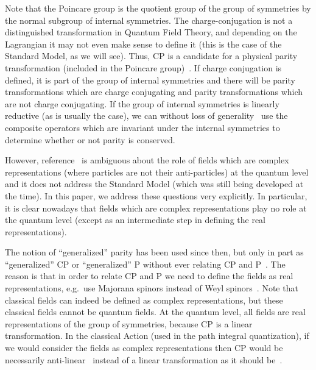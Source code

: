 \documentclass[11pt]{book}
\begin{document}
Note that the Poincare group is the quotient group of the group of
symmetries by the normal subgroup of internal symmetries. The
charge-conjugation is not a distinguished transformation in Quantum
Field Theory, and depending on the Lagrangian it may not even make sense
to define it (this is the case of the Standard Model, as we will see).
Thus, CP is a candidate for a physical parity transformation (included
in the Poincare group)~\cite{Lee1966Space}. If charge conjugation is defined, it is part of the group
of internal symmetries and there will be parity transformations which
are charge conjugating and parity transformations which are not charge
conjugating. If the group of internal symmetries is linearly reductive
(as is usually the case), we can without loss of
generality~\cite{Sartori1991Geometric}
use the composite operators which are invariant under the internal
symmetries to determine whether or not parity is conserved.

However, reference~\cite{Lee1966Space} is ambiguous about the role of fields which are complex
representations (where particles are not their anti-particles) at the
quantum level and it does not address the Standard Model (which was
still being developed at the time). In this paper, we address these
questions very explicitly. In particular, it is clear nowadays that
fields which are complex representations play no role at the quantum
level (except as an intermediate step in defining the real
representations).

The notion of ``generalized'' parity has been used since then, but only
in part as ``generalized'' CP or ``generalized'' P without ever relating
CP and P~\cite{Ecker1981Quark}.
The reason is that in order to relate CP and P we need to define the
fields as real representations, e.g.~use Majorana spinors instead of
Weyl spinors~\cite{Dreiner2010Two}. Note that classical fields can indeed be defined as complex
representations, but these classical fields cannot be quantum fields. At
the quantum level, all fields are real representations of the group of
symmetries, because CP is a linear transformation. In the classical
Action (used in the path integral quantization), if we would consider
the fields as complex representations then CP would be necessarily
anti-linear~\cite{Ivanov2013Classification} instead of a linear transformation as it should
be~\cite{Aranda2017When}.
\end{document}
